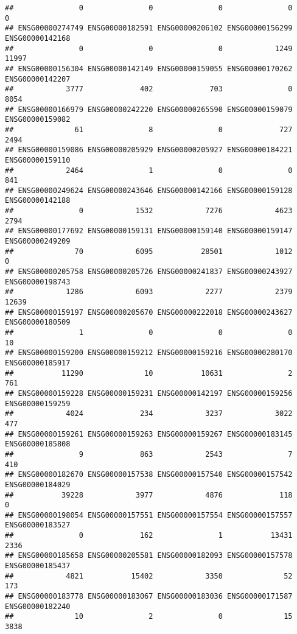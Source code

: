 \documentclass[
]{article}
\begin{document}
\begin{verbatim}
##               0               0               0               0               0 
## ENSG00000274749 ENSG00000182591 ENSG00000206102 ENSG00000156299 ENSG00000142168 
##               0               0               0            1249           11997 
## ENSG00000156304 ENSG00000142149 ENSG00000159055 ENSG00000170262 ENSG00000142207 
##            3777             402             703               0            8054 
## ENSG00000166979 ENSG00000242220 ENSG00000265590 ENSG00000159079 ENSG00000159082 
##              61               8               0             727            2494 
## ENSG00000159086 ENSG00000205929 ENSG00000205927 ENSG00000184221 ENSG00000159110 
##            2464               1               0               0             841 
## ENSG00000249624 ENSG00000243646 ENSG00000142166 ENSG00000159128 ENSG00000142188 
##               0            1532            7276            4623            2794 
## ENSG00000177692 ENSG00000159131 ENSG00000159140 ENSG00000159147 ENSG00000249209 
##              70            6095           28501            1012               0 
## ENSG00000205758 ENSG00000205726 ENSG00000241837 ENSG00000243927 ENSG00000198743 
##            1286            6093            2277            2379           12639 
## ENSG00000159197 ENSG00000205670 ENSG00000222018 ENSG00000243627 ENSG00000180509 
##               1               0               0               0              10 
## ENSG00000159200 ENSG00000159212 ENSG00000159216 ENSG00000280170 ENSG00000185917 
##           11290              10           10631               2             761 
## ENSG00000159228 ENSG00000159231 ENSG00000142197 ENSG00000159256 ENSG00000159259 
##            4024             234            3237            3022             477 
## ENSG00000159261 ENSG00000159263 ENSG00000159267 ENSG00000183145 ENSG00000185808 
##               9             863            2543               7             410 
## ENSG00000182670 ENSG00000157538 ENSG00000157540 ENSG00000157542 ENSG00000184029 
##           39228            3977            4876             118               0 
## ENSG00000198054 ENSG00000157551 ENSG00000157554 ENSG00000157557 ENSG00000183527 
##               0             162               1           13431            2336 
## ENSG00000185658 ENSG00000205581 ENSG00000182093 ENSG00000157578 ENSG00000185437 
##            4821           15402            3350              52             173 
## ENSG00000183778 ENSG00000183067 ENSG00000183036 ENSG00000171587 ENSG00000182240 
##              10               2               0              15            3838 

\end{verbatim}
\end{document}
